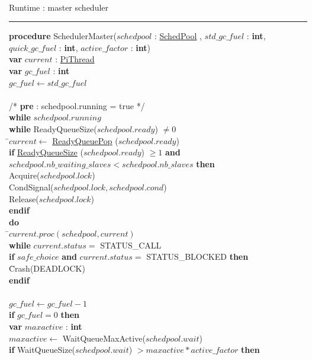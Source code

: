 \documentclass[a4paper,11pt]{article}
\newenvironment{program}{
  \begin{sffamily}
  \begin{scriptsize}
  \begin{tabbing}}
 {\end{tabbing}
  \end{scriptsize}
  \end{sffamily}}
\newcommand{\kw}[1]{\textsf{\textbf{#1}}}
\newcommand{\pindent}{\hspace{2em}\=}
\newcommand{\synchro}[1]{\textcolor{synchrocolor}{#1}}
\newcommand{\algotitle}[1]{\noindent\\ \noindent#1\par\nobreak\vspace{3pt}\hrule\vspace{6pt}}
\newcommand{\algosection}[1]{
  \phantomsection
  \algotitle{#1}
}
\newcommand{\myref}[1]{
  \hyperref[#1]{#1}
}
\begin{document}
\label{SchedulerMaster}
\algosection{Runtime : master scheduler}
\begin{program}
  \kw{procedure} SchedulerMaster($schedpool$ : \myref{SchedPool}, $std\_gc\_fuel$ : \kw{int}, $quick\_gc\_fuel$ : \kw{int}, $active\_factor$ : \kw{int}) \\
  \pindent\kw{var} $current$ : \myref{PiThread} \\
  \>\kw{var} $gc\_fuel$ : \kw{int} \\
  \>$gc\_fuel \leftarrow std\_gc\_fuel$ \\
  \>\\
  \> /* \kw{pre} : schedpool.running = true */ \\
  \>\kw{while} $schedpool.running$ \\
  \>\pindent\kw{while} ReadyQueueSize($schedpool.ready$) $\neq 0$ \\
  \>\>\pindent$current \leftarrow$ \synchro{\myref{ReadyQueuePop}($schedpool.ready$)} \\
  \>\>\>\kw{if} \myref{ReadyQueueSize}($schedpool.ready$) $\ge 1$ \kw{and} $schedpool.nb\_waiting\_slaves < schedpool.nb\_slaves$ \kw{then} \\
  \>\>\>\pindent\synchro{Acquire($schedpool.lock$)} \\
  \>\>\>\>\synchro{CondSignal($schedpool.lock, schedpool.cond$)} \\
  \>\>\>\>\synchro{Release($schedpool.lock$)} \\
  \>\>\>\kw{endif} \\
  \>\>\>\kw{do} \\
  \>\>\>\pindent$current.proc(schedpool, current)$ \\
  \>\>\>\kw{while} $current.status =$ STATUS\_CALL \\
  \>\>\>\kw{if} $safe\_choice$ \kw{and} $current.status =$ STATUS\_BLOCKED \kw{then} \\
  \>\>\>\pindent Crash(DEADLOCK) \\
  \>\>\>\kw{endif} \\
  \>\>\>\\
  \>\>\>$gc\_fuel \leftarrow gc\_fuel - 1$ \\
  \>\>\>\kw{if} $gc\_fuel = 0$ \kw{then} \\
  \>\>\>\pindent\kw{var} $maxactive$ : \kw{int} \\
  \>\>\>\>$maxactive \leftarrow$ WaitQueueMaxActive($schedpool.wait$) \\
  \>\>\>\>\kw{if} WaitQueueSize($schedpool.wait$) $> maxactive * active\_factor$ \kw{then} \\

\end{program}
\end{document}

